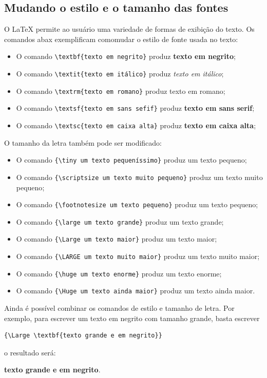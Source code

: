 	
\subsection{Mudando o estilo e o tamanho das fontes}	

O LaTeX permite ao usuário uma variedade de formas de exibição do texto. Os comandos abax exemplificam comomudar o estilo de fonte usada no texto:
\begin{itemize}
	\item O comando \verb!\textbf{texto em negrito}! produz \textbf{texto em negrito};
	\item O comando \verb!\textit{texto em itálico}! produz \textit{texto em itálico};
	\item O comando \verb!\textrm{texto em romano}! produz \textrm{texto em romano};
	\item O comando \verb!\textsf{texto em sans sefif}! produz \textbf{texto em sans serif};
	\item O comando \verb!\textsc{texto em caixa alta}! produz \textbf{texto em caixa alta};
\end{itemize}

O tamanho da letra também pode ser modificado:
\begin{itemize}
	\item O comando \verb!{\tiny um texto pequeníssimo}! produz {\tiny um texto pequeno};
	\item O comando \verb!{\scriptsize um texto muito pequeno}! produz {\scriptsize um texto muito pequeno};
	\item O comando \verb!{\footnotesize um texto pequeno}! produz {\footnotesize um texto pequeno};
	\item O comando \verb!{\large um texto grande}! produz {\large um texto grande};
	\item O comando \verb!{\Large um texto maior}! produz {\Large um texto maior};
	\item O comando \verb!{\LARGE um texto muito maior}! produz {\LARGE um texto muito maior};
	\item O comando \verb!{\huge um texto enorme}! produz {\huge um texto enorme};
	\item O comando \verb!{\Huge um texto ainda maior}! produz {\Huge um texto ainda maior}.
\end{itemize}

Ainda é possível combinar os comandos de estilo e tamanho de letra. Por exemplo, para escrever um texto em negrito com tamanho grande, basta escrever
\begin{verbatim}
{\Large \textbf{texto grande e em negrito}}
\end{verbatim}
o resultado será:
\begin{center}
{\Large \textbf{texto grande e em negrito}}.
\end{center}

